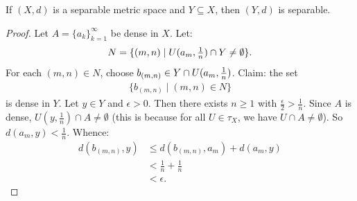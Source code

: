     \begin{proposition}
        If $(X,d)$ is a separable metric space and $Y \subseteq X$, then $(Y,d)$ is separable.
    \end{proposition}
        \begin{proof}
            Let $A = \{a_k\}_{k = 1}^\infty$ be dense in $X$. Let:
                \begin{equation*}
                \begin{split}
                    N = \{(m,n) \mid U(a_m,{\textstyle \frac{1}{n}}) \cap Y \neq \emptyset \}.
                \end{split}
                \end{equation*}
            For each $(m,n) \in N$, choose $b_{(m,n)} \in Y \cap U(a_m,{\textstyle \frac{1}{n}})$. Claim: the set
                \begin{equation*}
                \begin{split}
                    \{b_{(m,n)} \mid (m,n) \in N\}
                \end{split}
                \end{equation*}
            is dense in $Y$. Let $y \in Y$ and $\epsilon > 0$. Then there exists $n \geq 1$ with $\frac{\epsilon}{2} > \frac{1}{n}$. Since $A$ is dense, $U(y,\frac{1}{n}) \cap A \neq \emptyset$ (this is because for all $U \in \tau_X$, we have $U \cap A \neq \emptyset$). So $d(a_m, y) < \frac{1}{n}$. Whence:
                \begin{equation*}
                \begin{split}
                    d(b_{(m,n)},y)
                    & \leq d(b_{(m,n)},a_m) +  d(a_m,y) \\
                    & < \frac{1}{n} + \frac{1}{n} \\
                    & < \epsilon.
                \end{split}
                \end{equation*}
        \end{proof}

